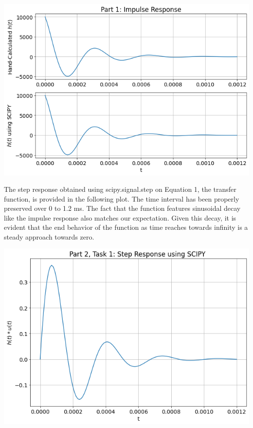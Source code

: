 \documentclass[12pt]{report}
\begin{document}
\begin{center}
	\includegraphics[scale = 0.495]{Lab 5 - Plots/Part1.png}\\[1.0 cm]
\end{center}

The step response obtained using scipy.signal.step on Equation 1, the transfer function, is provided in the following plot. The time interval has been properly preserved over 0 to 1.2 ms. The fact that the function features sinusoidal decay like the impulse response also matches our expectation. Given this decay, it is evident that the end behavior of the function as time reaches towards infinity is a steady approach towards zero. \\

\begin{center}
	\includegraphics[scale = 0.495]{Lab 5 - Plots/Part2-Task1.png}\\[1.0 cm]
\end{center}
\end{document}
